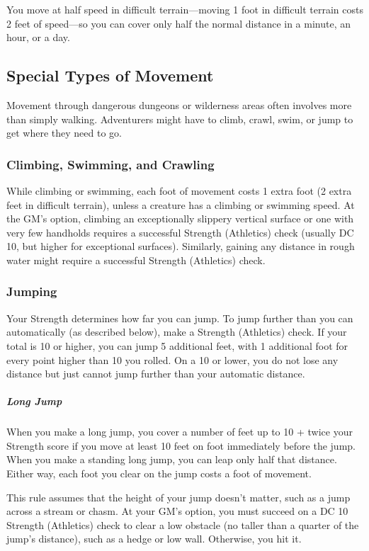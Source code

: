 You move at half speed in difficult terrain---moving 1 foot in difficult terrain costs 2 feet of speed---so you can cover only half the normal distance in a minute, an hour, or a day.

\subsection{Special Types of Movement}

Movement through dangerous dungeons or wilderness areas often involves more than simply walking. Adventurers might have to climb, crawl, swim, or jump to get where they need to go.

\subsubsection{Climbing, Swimming, and Crawling}

While climbing or swimming, each foot of movement costs 1 extra foot (2 extra feet in difficult terrain), unless a creature has a climbing or swimming speed. At the GM's option, climbing an exceptionally slippery vertical surface or one with very few handholds requires a successful Strength (Athletics) check (usually DC 10, but higher for exceptional surfaces). Similarly, gaining any distance in rough water might require a successful Strength (Athletics) check.

\subsubsection{Jumping}

Your Strength determines how far you can jump. To jump further than you can automatically (as described below), make a Strength (Athletics) check. If your total is 10 or higher, you can jump 5 additional feet, with 1 additional foot for every point higher than 10 you rolled. On a 10 or lower, you do not lose any distance but just cannot jump further than your automatic distance.

\subparagraph*{Long Jump} When you make a long jump, you cover a number of feet up to 10 + twice your Strength score if you move at least 10 feet on foot immediately before the jump. When you make a standing long jump, you can leap only half that distance. Either way, each foot you clear on the jump costs a foot of movement.

This rule assumes that the height of your jump doesn't matter, such as a jump across a stream or chasm. At your GM's option, you must succeed on a DC 10 Strength (Athletics) check to clear a low obstacle (no taller than a quarter of the jump's distance), such as a hedge or low wall. Otherwise, you hit it.

